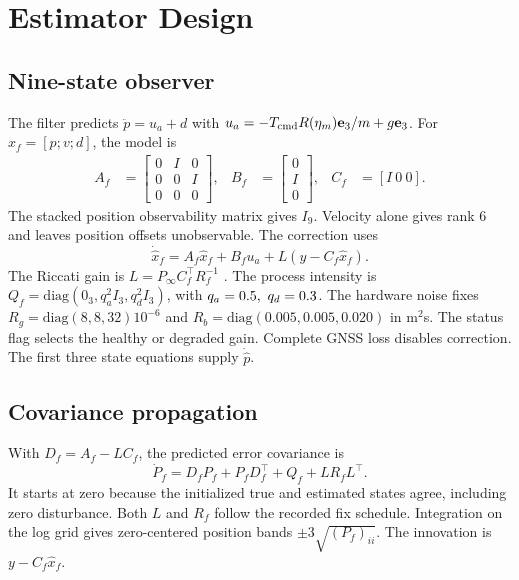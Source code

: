 \documentclass[conference]{IEEEtran}
\newcommand{\e}{\mathbf e_3}
\begin{document}
\clearpage
\section{Estimator Design}
\subsection{Nine-state observer}
The filter predicts \(\ddot p=u_a+d\) with
\(u_a=-T_{\rm cmd}R(\eta_m)\e/m+g\e\).
For \(x_f=[p;v;d]\), the model is
\begin{align}
A_f&=\begin{bmatrix}0&I&0\\0&0&I\\0&0&0\end{bmatrix},&
B_f&=\begin{bmatrix}0\\I\\0\end{bmatrix},&
C_f&=[I\ 0\ 0].
\end{align}
The stacked position observability matrix gives \(I_9\).
Velocity alone gives rank \(6\) and leaves position
offsets unobservable. The correction uses
\begin{equation}
\dot{\hat x}_f=A_f\hat x_f+B_fu_a+L(y-C_f\hat x_f).
\end{equation}
The Riccati gain is \(L=P_\infty C_f^\top R_f^{-1}\)
\cite{kalman}. The process intensity is
\(Q_f=\mathrm{diag}(0_3,q_a^2 I_3,q_d^2 I_3)\), with
\(q_a=0.5,\ q_d=0.3\). The hardware noise fixes
\(R_g=\mathrm{diag}(8,8,32)10^{-6}\) and
\(R_b=\mathrm{diag}(0.005,0.005,0.020)\) in m\(^2\)s.
The status flag selects the healthy or degraded gain.
Complete GNSS loss disables correction.
The first three state equations supply \(\dot{\hat p}\).

\begin{table}[!ht]
\centering
\caption{Flight gain entries. \(K\) indices follow the state order
of Section II. Each filter triplet corresponds to one GNSS axis.}
\resizebox{\columnwidth}{!}{}
\end{table}

\newpage
\subsection{Covariance propagation}
With \(D_f=A_f-LC_f\), the predicted error covariance is
\begin{equation}
\dot P_f=D_fP_f+P_fD_f^\top+Q_f+LR_fL^\top.
\end{equation}
It starts at zero because the initialized true and estimated
states agree, including zero disturbance. Both \(L\) and \(R_f\)
follow the recorded fix schedule. Integration on the log grid
gives zero-centered position bands
\(\pm3\sqrt{(P_f)_{ii}}\).
The innovation is \(y-C_f\hat x_f\).
\end{document}
